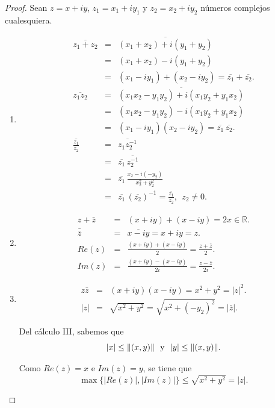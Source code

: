 \begin{proof}
Sean $z = x+iy$, $z_1 = x_1 + iy_1$ y $z_2 = x_2 + iy_2$ números complejos cualesquiera.

\begin{enumerate}
\item \begin{eqnarray*}
\overline{z_1 + z_2}  &=& \overline{(x_1+x_2) + i(y_1 + y_2)} \\\
&=&(x_1+x_2) - i(y_1 + y_2) \\
& =& (x_1 - iy_1) + (x_2 - iy_2) = \overline{z_1} + \overline{z_2}. \\
\overline{z_1 z_2} &=&  \overline{(x_1 x_2 - y_1y_2) + i(x_1y_2 + y_1x_2)} \\
&=&  (x_1 x_2 - y_1y_2) - i(x_1y_2 + y_1x_2) \\
&=& (x_1 -iy_1) (x_2 - iy_2) = \overline{z_1} \, \overline{z_2}.  \\
\overline{\frac{z_1}{z_2}} &=& \overline{z_1 z_2^{-1}} \\
&=& \overline{z_1} \, \overline{z_2^{-1}} \\
&=& \overline{z_1} \, \frac{x_2 - i(-y_2)}{x_2^2 + y_2^2} \\
&=& \overline{z_1} \, (\overline{z_2})^{-1} = \frac{\overline{z_1}}{\overline{z_2}}, ~~ z_2 \neq 0.
\end{eqnarray*}

\item \begin{eqnarray*}
z + \bar{z} &=& (x+iy) + (x-iy) = 2x \in \mathbb{R}. \\
\bar{\bar{z}} &=& \overline{x -iy} = x+iy = z. \\
Re(z) &=& \frac{(x+iy) + (x-iy)}{2} = \frac{z + \bar{z}}{2}. \\
Im(z) &=& \frac{(x+iy) - (x-iy)}{2i} = \frac{z - \bar{z}}{2i}.
\end{eqnarray*}

\item \begin{eqnarray*}
z \bar{z} &=& (x+iy)(x-iy) = x^2 + y^2 = |z|^2. \\
|z| &=& \sqrt{x^2+y^2} = \sqrt{x^2 + (-y_2)^2} = |\bar{z}|.
\end{eqnarray*}

Del cálculo III, sabemos que
$$|x| \leq \lVert(x,y)\rVert ~~\mbox{y}~~ |y| \leq \lVert(x,y)\rVert.$$

Como $Re(z) = x$ e $Im(z) = y$, se tiene que
$$\max\{|Re(z)|, |Im(z)|\} \leq \sqrt{x^2+y^2} = |z|.$$


\end{enumerate}
\end{proof}
